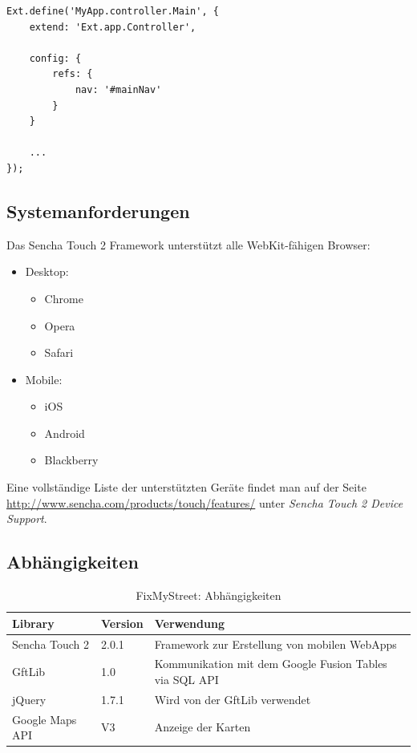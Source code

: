 \lstset{language=JavaScript}
\begin{lstlisting}[float, caption=Beispiel eines Component-Queries in Sencha Touch 2, label=st2-componentquery]
Ext.define('MyApp.controller.Main', {
	extend: 'Ext.app.Controller',
	
	config: {
		refs: {
			nav: '#mainNav'
		}
	}
	
	...
});
\end{lstlisting}

\subsection{Systemanforderungen}
Das Sencha Touch 2 Framework unterstützt alle WebKit-fähigen Browser:

\begin{itemize}
\item Desktop:
\begin{itemize}
	\item Chrome
	\item Opera
	\item Safari
\end{itemize}

\item Mobile:
\begin{itemize}
	\item iOS
	\item Android
	\item Blackberry
\end{itemize}
\end{itemize}

Eine vollständige Liste der unterstützten Geräte findet man auf der Seite \url{http://www.sencha.com/products/touch/features/} unter \emph{Sencha Touch 2 Device Support}.

\subsection{Abhängigkeiten}
\begin{table}[H]
\centering
\begin{tabular}{|p{0.25\threecelltabwidth}|p{0.1\threecelltabwidth}|p{0.65\threecelltabwidth}|}
\hline 
\textbf{Library} & \textbf{Version} & \textbf{Verwendung} \\ 
\hline 
Sencha Touch 2 & 2.0.1 & Framework zur Erstellung von mobilen \gls{WebApp}s \\ 
\hline 
GftLib & 1.0 & Kommunikation mit dem Google Fusion Tables via SQL \gls{API} \\ 
\hline 
jQuery & 1.7.1 & Wird von der GftLib verwendet \\ 
\hline 
Google Maps \gls{API} & V3 & Anzeige der Karten \\ 
\hline 
\end{tabular} 
\caption{FixMyStreet: Abhängigkeiten}
\end{table}

